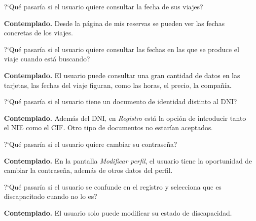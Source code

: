 \begin{escenario}
    \centering
    ?`Qué pasaría si el usuario quiere consultar la fecha de sus viajes?

    \begin{solucion}
        \centering
        \textbf{Contemplado.} Desde la página de mis reservas se pueden ver las fechas concretas de los viajes.
    \end{solucion}
\end{escenario}

\begin{escenario}
    \centering
    ?`Qué pasaría si el usuario quiere consultar las fechas en las que se produce el viaje cuando está buscando?

    \begin{solucion}
        \centering
        \textbf{Contemplado.} El usuario puede consultar una gran cantidad de datos en las tarjetas, las fechas del viaje figuran, como las horas, el precio, la compañía.
    \end{solucion}
\end{escenario}

\begin{escenario} %
    \centering
    ?`Qué pasaría si el usuario tiene un documento de identidad distinto al DNI?

    \begin{solucion}
        \centering
        \textbf{Contemplado.} Además del DNI, en \textit{Registro} está la opción de introducir tanto el NIE como el CIF. Otro tipo de documentos no estarían aceptados.
    \end{solucion}
\end{escenario}

\begin{escenario} %
    \centering
    ?`Qué pasaría si el usuario quiere cambiar su contraseña?

    \begin{solucion}
        \centering
        \textbf{Contemplado.} En la pantalla \textit{Modificar perfil}, el usuario tiene la oportunidad de cambiar la contraseña, además de otros datos del perfil.
    \end{solucion}
\end{escenario}

\begin{escenario} %
    \centering
    ?`Qué pasaría si el usuario se confunde en el registro y selecciona que es discapacitado cuando no lo es?

    \begin{solucion}
        \centering
        \textbf{Contemplado.} El usuario solo puede modificar su estado de discapacidad.

    \end{solucion}
\end{escenario}

